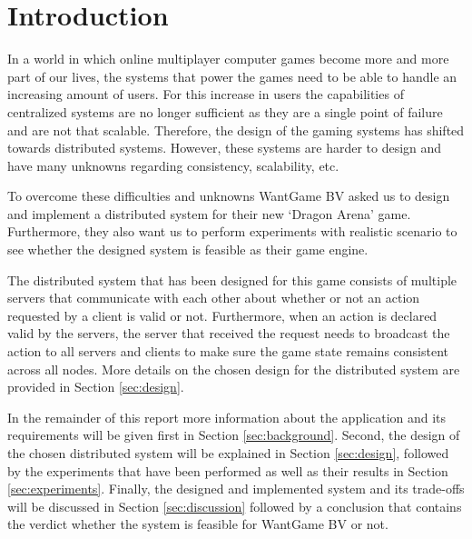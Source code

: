 \section{Introduction}
In a world in which online multiplayer computer games become more and more part of our lives, the systems that power the games need to be able to handle an increasing amount of users.
For this increase in users the capabilities of centralized systems are no longer sufficient as they are a single point of failure and are not that scalable.
Therefore, the design of the gaming systems has shifted towards distributed systems.
However, these systems are harder to design and have many unknowns regarding consistency, scalability, etc.

To overcome these difficulties and unknowns WantGame BV asked us to design and implement a distributed system for their new `Dragon Arena' game.
Furthermore, they also want us to perform experiments with realistic scenario to see whether the designed system is feasible as their game engine.

The distributed system that has been designed for this game consists of multiple servers that communicate with each other about whether or not an action requested by a client is valid or not. 
Furthermore, when an action is declared valid by the servers, the server that received the request needs to broadcast the action to all servers and clients to make sure the game state remains consistent across all nodes.
More details on the chosen design for the distributed system are provided in Section \ref{sec:design}.

In the remainder of this report more information about the application and its requirements will be given first in Section \ref{sec:background}. 
Second, the design of the chosen distributed system will be explained in Section \ref{sec:design}, followed by the experiments that have been performed as well as their results in Section \ref{sec:experiments}.
Finally, the designed and implemented system and its trade-offs will be discussed in Section \ref{sec:discussion} followed by a conclusion that contains the verdict whether the system is feasible for WantGame BV or not.